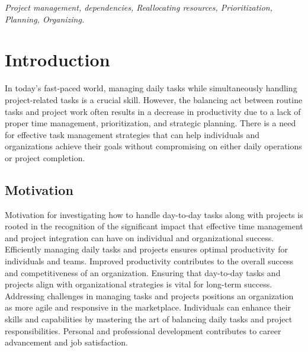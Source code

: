 \documentclass{chart}
\begin{document}
\begin{keywords}
\textit{ Project management,  dependencies, Reallocating resources, Prioritization, Planning, Organizing.}
\end{keywords} 
	
\newpage
 \vspace*{0.5cm}
            
\tableofcontents 
\listoffigures          
\newpage
  \vspace*{0.5cm}
\section{Introduction}\label{sec:intro}  
\hspace{1cm} In today's fast-paced world, managing daily tasks while simultaneously handling project-related tasks is a crucial skill. However, the balancing act between routine tasks and project work often results in a decrease in productivity due to a lack of proper time management, prioritization, and strategic planning. There is a need for effective task management strategies that can help individuals and organizations achieve their goals without compromising on either daily operations or project completion. 
\subsection{Motivation} 
\hspace{1cm}Motivation for investigating how to handle day-to-day tasks along with projects is rooted in the recognition of the significant impact that effective time management and project integration can have on individual and organizational success. Efficiently managing daily tasks and projects ensures optimal productivity for individuals and teams. Improved productivity contributes to the overall success and competitiveness of an organization. Ensuring that day-to-day tasks and projects align with organizational strategies is vital for long-term success. Addressing challenges in managing tasks and projects positions an organization as more agile and responsive in the marketplace. Individuals can enhance their skills and capabilities by mastering the art of balancing daily tasks and project responsibilities. Personal and professional development contributes to career advancement and job satisfaction.
\end{document}
